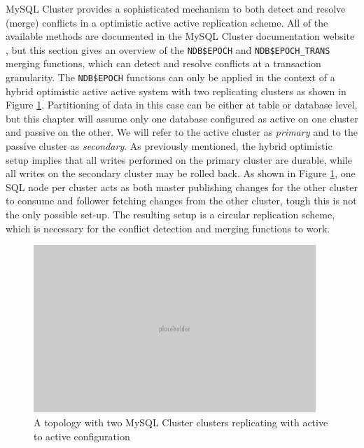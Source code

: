 MySQL Cluster provides a sophisticated mechanism to both detect and resolve (merge) conflicts in a optimistic active active replication scheme.
All of the available methods are documented in the MySQL Cluster documentation website \cite{mysql-cluster-documentation-replication}, but this section gives an overview of the \texttt{NDB\$EPOCH} and \texttt{NDB\$EPOCH\_TRANS} merging functions, which can detect and resolve conflicts at a transaction granularity.
The \texttt{NDB\$EPOCH} functions can only be applied in the context of a hybrid optimistic active active system with two replicating clusters as shown in Figure \ref{fig:two-active-active-clusters}.
Partitioning of data in this case can be either at table or database level, but this chapter will assume only one database configured as active on one cluster and passive on the other.
We will refer to the active cluster as \emph{primary} and to the passive cluster as \emph{secondary}.
As previously mentioned, the hybrid optimistic setup implies that all writes performed on the primary cluster are durable, while all writes on the secondary cluster may be rolled back.
As shown in Figure \ref{fig:two-active-active-clusters}, one SQL node per cluster acts as both master publishing changes for the other cluster to consume and follower fetching changes from the other cluster, tough this is not the only possible set-up.
The resulting setup is a circular replication scheme, which is necessary for the conflict detection and merging functions to work.

\begin{figure}[h]
\caption{A topology with two MySQL Cluster clusters replicating with active to active configuration}
\label{fig:two-active-active-clusters}
\centering
\includegraphics[width=0.95\textwidth]{images/placeholder.png}
\end{figure}


